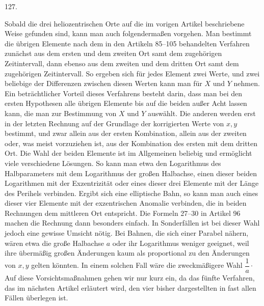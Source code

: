 \par{}\medskip
\begin{center}\hypertarget{native-174-article127}{}127.\end{center}
Sobald die drei heliozentrischen Orte auf die im vorigen Artikel beschriebene Weise gefunden
sind, kann man auch folgendermaßen vorgehen. Man bestimmt die übrigen Elemente nach dem in den
Artikeln 85–105 behandelten Verfahren zunächst aus dem ersten und dem zweiten Ort samt dem
zugehörigen Zeitintervall, dann ebenso aus dem zweiten und dem dritten Ort samt dem zugehörigen
Zeitintervall. So ergeben sich für jedes Element zwei Werte, und zwei beliebige der Differenzen
zwischen diesen Werten kann man für $X$ und $Y$ nehmen. Ein beträchtlicher Vorteil dieses Verfahrens
besteht darin, dass man bei den ersten Hypothesen alle übrigen Elemente bis auf die beiden außer
Acht lassen kann, die man zur Bestimmung von $X$ und $Y$ auswählt. Die anderen werden erst in der
letzten Rechnung auf der Grundlage der korrigierten Werte von $x,y$ bestimmt, und zwar allein aus der
ersten Kombination, allein aus der zweiten oder, was meist vorzuziehen ist, aus der Kombination des
ersten mit dem dritten Ort. Die Wahl der beiden Elemente ist im Allgemeinen beliebig und ermöglicht
viele verschiedene Lösungen. So kann man etwa den Logarithmus des Halbparameters mit dem Logarithmus
der großen Halbachse, einen dieser beiden Logarithmen mit der Exzentrizität oder eines dieser drei
Elemente mit der Länge des Perihels verbinden. Ergibt sich eine elliptische Bahn, so kann man auch
eines dieser vier Elemente mit der exzentrischen Anomalie verbinden, die in beiden Rechnungen dem
mittleren Ort entspricht. Die Formeln 27–30 in Artikel 96 machen die Rechnung dann besonders
einfach. In Sonderfällen ist bei dieser Wahl jedoch eine gewisse Umsicht nötig. Bei Bahnen, die sich
einer Parabel nähern, wären etwa die große Halbachse $a$ oder ihr Logarithmus weniger geeignet, weil
ihre übermäßig großen Änderungen kaum als proportional zu den Änderungen von $x,y$ gelten könnten. In
einem solchen Fall wäre die zweckmäßigere Wahl $\dfrac{1}{a}\mathpunct{\cdot}$ Auf diese Vorsichtsmaßnahmen gehen wir nur kurz
ein, da das fünfte Verfahren, das im nächsten Artikel erläutert wird, den vier bisher dargestellten
in fast allen Fällen überlegen ist.
